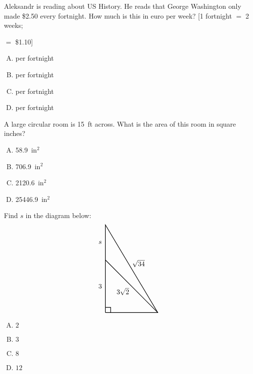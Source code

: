 \documentclass[12pt,letterpaper]{exam}
\begin{document}
\begin{questions}
\newpage



\question Aleksandr is reading about US History. He reads that George Washington only made \$2.50 every fortnight. How much is this in euro per week? [1 fortnight $=$ 2 weeks; \par {} $=$ \$1.10]
        \begin{enumerate}[A.]
        \item {} per fortnight
        \item {} per fortnight
        \item {} per fortnight
        \item {} per fortnight 
        \end{enumerate}



\vfill



\question A large circular room is 15~ft across. What is the area of this room in square inches?
        \begin{enumerate}[A.]
        \item 58.9~in$^2$
        \item 706.9~in$^2$
        \item 2120.6~in$^2$
        \item 25446.9~in$^2$
        \end{enumerate}



\vfill



\question Find $s$ in the diagram below:
	\[
	\begin{tikzpicture}[scale=0.9]
	\draw[line width=0.03cm] (0,0) -- (0,5) -- (3,0) -- (0,0);
	\draw[line width=0.03cm] (0,0.3) -- (0.3,0.3) -- (0.3,0);
	\draw[line width=0.03cm] (3,0) -- (0,3);
	\node at (-0.3,1.5) {$3$};
	\node at (1.9,2.8) {$\sqrt{34}$};
	\node at (1,1.2) {$3\sqrt{2}$};
	\node at (-0.3,4.0) {$s$};
	\end{tikzpicture}
	\]

\begin{enumerate}[A.]
\item $2$
\item $3$
\item $8$
\item $12$
\end{enumerate}




\end{questions}
\end{document}
